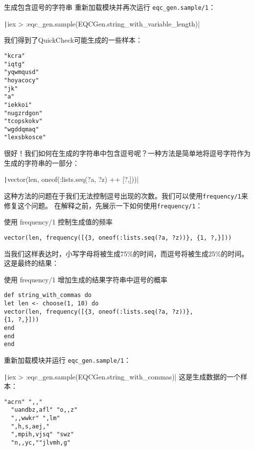 \begin{example}{生成包含逗号的字符串}
重新加载模块并再次运行 \texttt{eqc\_gen.sample/1}：

\texttt|iex > :eqc_gen.sample(EQCGen.string\_with\_variable\_length)|

我们得到了QuickCheck可能生成的一些样本：
\begin{code}{}  \begin{verbatim}
"kcra"
"iqtg"
"yqwmqusd"
"hoyacocy"
"jk"
"a"
"iekkoi"
"nugzrdgon"
"tcopskokv"
"wgddqmaq"
"lexsbkosce"
\end{verbatim}
  \end{code}
  


很好！我们如何在生成的字符串中包含逗号呢？一种方法是简单地将逗号字符作为生成的字符串的一部分：

\texttt|vector(len, oneof(:lists.seq(?a, ?z) ++ [?,]))|

这种方法的问题在于我们无法控制逗号出现的次数。我们可以使用\texttt{frequency/1}来修复这个问题。
在解释之前，先展示一下如何使用\texttt{frequency/1}：

\begin{code}{使用 frequency/1 控制生成值的频率}
  \begin{verbatim}
vector(len, frequency([{3, oneof(:lists.seq(?a, ?z))}, {1, ?,}]))
\end{verbatim}
  \end{code}
  

当我们这样表达时，小写字母将被生成75\%的时间，而逗号将被生成25\%的时间。这是最终的结果：


\begin{code}{使用 frequency/1 增加生成的结果字符串中逗号的概率}
\begin{verbatim}
def string_with_commas do
let len <- choose(1, 10) do
vector(len, frequency([{3, oneof(:lists.seq(?a, ?z))},
{1, ?,}]))
end
end
end
\end{verbatim}
\label{lst:increasing_the_probability_of_commas_in_the_resulting_string_using_frequency_1}
\end{code}

重新加载模块并运行 \texttt{eqc\_gen.sample/1}：

\texttt|iex > :eqc_gen.sample(EQCGen.string\_with\_commas)|
这是生成数据的一个样本：

\begin{code}{}  \begin{verbatim}
"acrn" ",,"
  "uandbz,afl" "o,,z"
  ",,wwkr" ",lm"
  ",h,s,aej,"
  ",mpih,vjsq" "swz"
  "n,,yc,""jlvmh,g"
\end{verbatim}
 \end{code}
  

\end{example}
